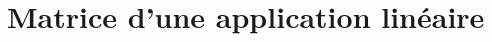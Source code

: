 \documentclass[../main.tex]{subfiles}
\begin{document}
\setcounter{chapter}{27}
\chapter{Matrice d'une application linéaire}
\tableofcontents
\clearpage
\end{document}
